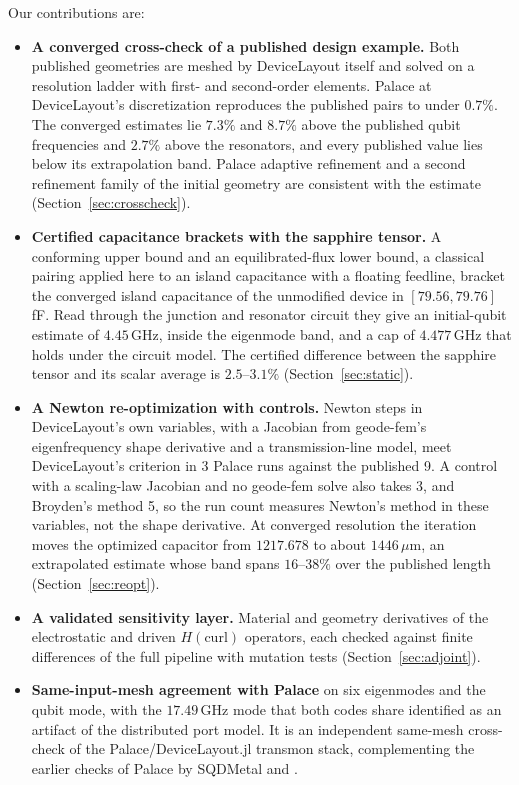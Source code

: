\documentclass{anvil-paper}
\begin{document}
Our contributions are:
\begin{itemize}
  \item \textbf{A converged cross-check of a published design example.}
    Both published geometries are meshed by DeviceLayout itself and solved
    on a resolution ladder with first- and second-order elements. Palace at
    DeviceLayout's discretization reproduces the published pairs to under
    $0.7\%$. The converged estimates lie $7.3\%$ and $8.7\%$ above the
    published qubit frequencies and $2.7\%$ above the resonators, and every
    published value lies below its extrapolation band. Palace adaptive
    refinement and a second refinement family of the initial geometry are
    consistent with the estimate (Section~\ref{sec:crosscheck}).
  \item \textbf{Certified capacitance brackets with the sapphire tensor.}
    A conforming upper bound and an equilibrated-flux lower bound, a
    classical pairing applied here to an island capacitance with a
    floating feedline, bracket the converged island capacitance of the
    unmodified device in $[79.56, 79.76]$\,fF. Read through the junction
    and resonator circuit they give an initial-qubit estimate of
    $4.45$\,GHz, inside the eigenmode band, and a cap of $4.477$\,GHz that
    holds under the circuit model. The certified difference between the
    sapphire tensor and its scalar average is $2.5$--$3.1\%$
    (Section~\ref{sec:static}).
  \item \textbf{A Newton re-optimization with controls.} Newton steps in
    DeviceLayout's own variables, with a Jacobian from geode-fem's
    eigenfrequency shape derivative and a transmission-line model, meet
    DeviceLayout's criterion in 3 Palace runs against the published 9. A
    control with a scaling-law Jacobian and no geode-fem solve also takes 3,
    and Broyden's method 5, so the run count measures Newton's method in
    these variables, not the shape derivative. At converged resolution the
    iteration moves the optimized capacitor from $1217.678$ to about
    $1446\,\mu$m, an extrapolated estimate whose band spans $16$--$38\%$
    over the published length (Section~\ref{sec:reopt}).
  \item \textbf{A validated sensitivity layer.} Material and geometry
    derivatives of the electrostatic and driven $H(\mathrm{curl})$
    operators, each checked against finite differences of the full
    pipeline with mutation tests (Section~\ref{sec:adjoint}).
  \item \textbf{Same-input-mesh agreement with Palace} on six eigenmodes
    and the qubit mode, with the $17.49$\,GHz mode that both codes share
    identified as an artifact of the distributed port model. It is an
    independent same-mesh cross-check of the Palace/DeviceLayout.jl
    transmon stack, complementing the earlier checks of Palace by SQDMetal
    \citep{sommers2025open} and \citet{ye2025electromagnetic}.
\end{itemize}
\end{document}
